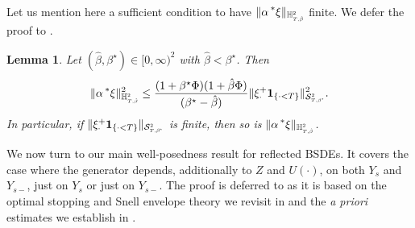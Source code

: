 \documentclass[10pt]{article} %
\newtheorem{lemma}[theorem]{Lemma}
\newcommand\cS{\mathcal S}
\newcommand{\smalltext}[1]{\text{\fontsize{4}{4}\selectfont$#1$}}
\def \H{\mathbb{H}}
\newcommand{\brs}[1]{\prescript{\ast}{}{#1}}
\begin{document}
Let us mention here a sufficient condition to have $\|\alpha \brs{\xi}\|_{\H^\smalltext{2}_{\smalltext{T}\smalltext{,}\smalltext{\hat\beta}}}$ finite. We defer the proof to .

\begin{lemma}\label{lem::integrability_xi}
	Let $(\hat\beta,\beta^\star) \in [0,\infty)^2$ with $\hat\beta < \beta^\star$. Then
	\begin{equation*}
		\|\alpha \brs{\xi}\|_{\H^\smalltext{2}_{\smalltext{T}\smalltext{,}\smalltext{\hat\beta}}}^2 
		\leq \frac{(1+\beta^\star \Phi)(1+\hat\beta \Phi)}{(\beta^\star-\hat\beta)}\|\xi^+_\cdot \mathbf{1}_{\{\cdot < T\}}\|^2_{\cS^\smalltext{2}_{\smalltext{T}\smalltext{,}\smalltext{\beta^\star}}}.
	\end{equation*}
	In particular, if $\|\xi^+_\cdot \mathbf{1}_{\{\cdot < T\}}\|_{\cS^\smalltext{2}_{\smalltext{T}\smalltext{,}\smalltext{\beta^\star}}}$ is finite, then so is $\|\alpha \brs{\xi}\|_{\H^\smalltext{2}_{\smalltext{T}\smalltext{,}\smalltext{\hat\beta}}}$.
\end{lemma}

We now turn to our main well-posedness result for reflected BSDEs. It covers the case where the generator depends, additionally to $Z$ and $U(\cdot)$, on both $Y_s$ and $Y_{s-}$, just on $Y_s$ or just on $Y_{s-}$. The proof is deferred to  as it is based on the optimal stopping and Snell envelope theory we revisit in  and the \emph{a priori} estimates we establish in .
\end{document}
